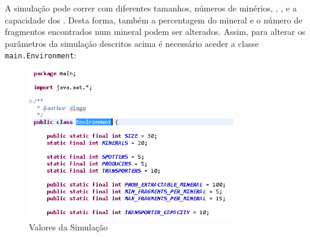 \documentclass[12pt]{report}
\begin{document}
A simulação pode correr com diferentes tamanhos, números de minérios, \spotters, \producers, \transporters e a capacidade dos \transporters. Desta forma, também a  percentagem do mineral e o número de fragmentos encontrados num mineral podem ser alterados.
Assim, para alterar os parâmetros da simulação descritos acima é necessário aceder a classe \java \texttt{main.Environment}:

\begin{figure}[h]
	\centering
	\includegraphics[width=0.8\textwidth]{javaEnvironment}
	\caption{Valores da Simulação}
	\label{javaEnvironment}
\end{figure}
\end{document}
